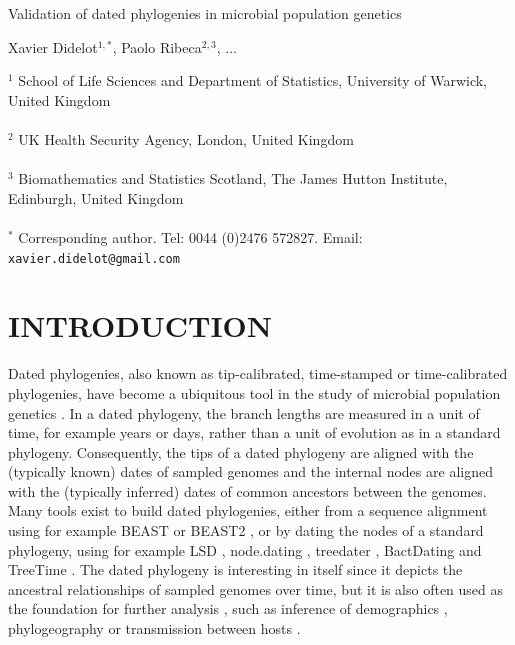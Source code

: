 \documentclass{article}
\begin{document}
{\Large Validation of dated phylogenies in microbial population genetics}


\vspace*{2cm}
Xavier Didelot$^{1,*}$, Paolo Ribeca$^{2,3}$, ...

\vspace*{2cm}
$^1$ School of Life Sciences and Department of Statistics, University of Warwick, United Kingdom\\\\
$^2$ UK Health Security Agency, London, United Kingdom\\\\
$^3$ Biomathematics and Statistics Scotland, The James Hutton Institute, Edinburgh, United Kingdom\\\\
$^*$ Corresponding author. Tel: 0044 (0)2476 572827. Email: \verb+xavier.didelot@gmail.com+


\newpage
\section*{INTRODUCTION}

Dated phylogenies, also known as tip-calibrated, time-stamped or time-calibrated phylogenies, have become a ubiquitous tool in the study of microbial population genetics 
\citep{Drummond2003,Biek2015,rieuxInferencesTipcalibratedPhylogenies2016}. In a dated phylogeny, the branch lengths are measured in a unit of time, for example years or days,
rather than a unit of evolution as in a standard phylogeny. Consequently, the tips of a dated phylogeny are aligned with the (typically known) dates of sampled genomes and
the internal nodes are aligned with the (typically inferred) dates of common ancestors between the genomes.
Many tools exist to build dated phylogenies, either from a sequence alignment using for example BEAST \citep{Suchard2018} or BEAST2 \citep{Bouckaert2019}, or by
dating the nodes of a standard phylogeny, using for example 
LSD \citep{To2016}, node.dating \citep{Jones2017}, treedater \citep{Volz2017}, BactDating \citep{Didelot2018} and TreeTime \citep{Sagulenko2018}.
The dated phylogeny is interesting in itself since it depicts the ancestral relationships of sampled genomes
over time, but it is also often used as the foundation for further analysis \citep{Didelot2022}, such as inference
of demographics \citep{Baele2016}, phylogeography \citep{Lemey2009} 
or transmission between hosts \citep{Didelot2017}.
\end{document}
